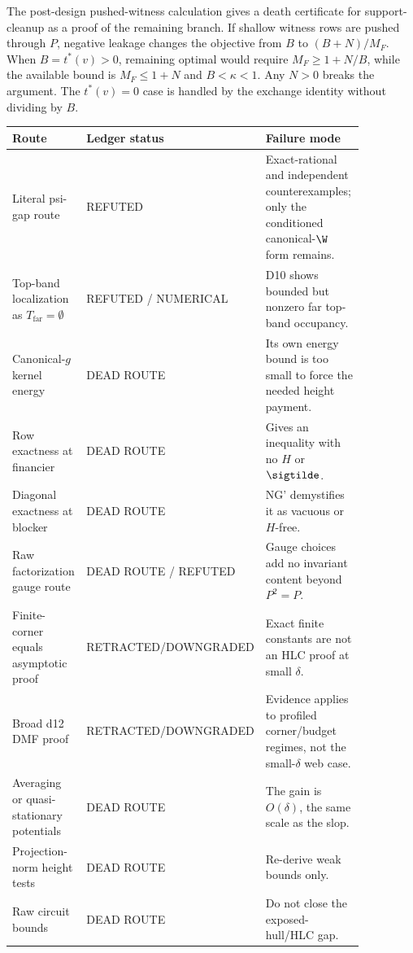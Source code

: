 \begin{downgradedstatement}
\provedbadge The post-design pushed-witness calculation gives a death certificate for
support-cleanup as a proof of the remaining branch.  If shallow witness rows are pushed
through \(P\), negative leakage changes the objective from \(B\) to \((B+N)/M_F\).  When
\(B=t^*(v)>0\), remaining optimal would require \(M_F\ge 1+N/B\), while the available
bound is \(M_F\le 1+N\) and \(B<\kappa<1\).  Any \(N>0\) breaks the argument.  The
\(t^*(v)=0\) case is handled by the exchange identity without dividing by \(B\).
\end{downgradedstatement}

\begin{longtable}{p{0.24\linewidth}p{0.20\linewidth}p{0.42\linewidth}}
\toprule
Route & Ledger status & Failure mode \\
\midrule
Literal psi-gap route & REFUTED & Exact-rational and independent counterexamples; only the conditioned canonical-\(\W\) form remains. \\
Top-band localization as \(T_{\mathrm{far}}=\emptyset\) & REFUTED / NUMERICAL & D10 shows bounded but nonzero far top-band occupancy. \\
Canonical-\(g\) kernel energy & DEAD ROUTE & Its own energy bound is too small to force the needed height payment. \\
Row exactness at financier & DEAD ROUTE & Gives an inequality with no \(H\) or \(\sigtilde\). \\
Diagonal exactness at blocker & DEAD ROUTE & NG' demystifies it as vacuous or \(H\)-free. \\
Raw factorization gauge route & DEAD ROUTE / REFUTED & Gauge choices add no invariant content beyond \(P^2=P\). \\
Finite-corner equals asymptotic proof & RETRACTED/\newline DOWNGRADED & Exact finite constants are not an HLC proof at small \(\delta\). \\
Broad d12 DMF proof & RETRACTED/\newline DOWNGRADED & Evidence applies to profiled corner/budget regimes, not the small-\(\delta\) web case. \\
Averaging or quasi-stationary potentials & DEAD ROUTE & The gain is \(O(\delta)\), the same scale as the slop. \\
Projection-norm height tests & DEAD ROUTE & Re-derive weak bounds only. \\
Raw circuit bounds & DEAD ROUTE & Do not close the exposed-hull/HLC gap. \\

\end{longtable}
